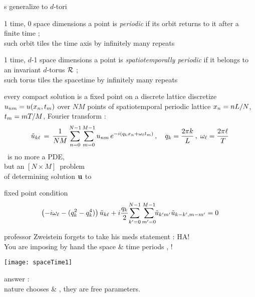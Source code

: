 \begin{frame}{\po s generalize to $d$-tori}

\begin{block}{1 time, 0 space dimensions}
a {\statesp} point is {\em periodic} if its orbit returns to it
after a finite time \period{} ;
\\
such orbit tiles the time axis
by infinitely many repeats
\end{block}

\bigskip

\begin{block}{1 time, $d$-1 space dimensions}
 a {\statesp} point is {\em spatiotemporally periodic} if
it belongs to \\ an invariant $d$-torus ${\mathcal{R}}$ ;
\\
such torus tiles the spacetime
by infinitely many repeats
\end{block}
\end{frame}

\begin{frame}{every compact solution is a fixed point on a discrete lattice}
discretize $u_{nm} = u(x_n,t_m)$ over
$N M$ points of spatiotemporal periodic lattice $x_n = n L/N$,
 $t_m = m {T_{}}/M$, Fourier transform :
\[
\tilde{u}_{k\ell} \,=\,
  \frac{1}{NM} \sum^{N-1}_{n=0} \sum^{M-1}_{m=0}
  u_{nm} \, e^{-i(q_kx_n + \omega_\ell t_m)}
    \,,\quad
q_k = \frac{2 \pi k}{L}
    \,,\;
\omega_\ell = \frac{2 \pi \ell}{{T_{}}}
\]
\KS\ is no more a PDE, \\
but an {\color{blue}{algebraic}} $[N\!\times\!M]$\dmn\ problem\\
of determining {\color{blue}{global}} solution ${\bf u}$ to
\begin{block}{fixed point condition}
\[
\left(- i \omega_\ell - ( q_k^2 - q_k^4 ) \right)\tilde{u}_{k\ell}
+ i \frac{q_k}{2} \!\sum_{k'=0}^{N-1} \sum^{M-1}_{m'=0}\!\!
\tilde{u}_{k'm'} \tilde{u}_{k-k',m-m'}
    = 0
\]
\end{block}
\end{frame}

\begin{frame}{professor Zweistein forgets to take his meds}
\medskip
statement : {\huge HA!} \\
You are imposing by hand the space \& time periods
\speriod{}, \period{} {\huge !}

\begin{center}
\texttt{[image: spaceTime1]}
\end{center}

answer : {\huge\color{red}{NO!}} \\
nature chooses \speriod{} \& \period{},
they are free parameters.
\end{frame}

